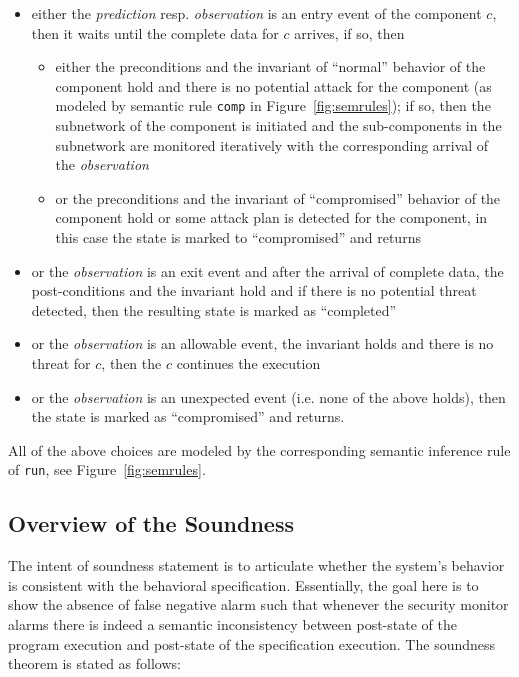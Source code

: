 \documentclass[conference]{IEEEtran}
\begin{document}
\begin{itemize}
\item either the \emph{prediction} resp. \emph{observation} is an entry event of the component $c$, then it waits until the complete data for $c$ arrives, if so, then
\begin{itemize}
\item either the preconditions and the invariant of ``normal'' behavior of the component hold and there is no potential attack for the component (as modeled by semantic rule {\tt comp} in Figure~\ref{fig:semrules}); if so, then the subnetwork of the component is initiated and the sub-components in the subnetwork are monitored iteratively with the corresponding arrival of the \emph{observation}
\item or the preconditions and the invariant of ``compromised''  behavior of the component hold or some attack plan is detected for the component, in this case the state is marked to ``compromised'' and returns
\end{itemize}
\item or the \emph{observation} is an exit event and after the arrival of complete data, the post-conditions and the invariant hold and if there is no potential threat detected, then the resulting state is marked as ``completed''
\item or the \emph{observation} is an allowable event, the invariant holds and there is no threat for $c$, then the $c$ continues the execution
\item or the \emph{observation} is an unexpected event (i.e. none of the above holds), then the state is marked as ``compromised'' and returns.
\end{itemize}
All of the above choices are modeled by the corresponding semantic inference rule of \texttt{run}, see Figure~\ref{fig:semrules}.
\subsection{Overview of the Soundness}\label{subsec:soundness}
The intent of soundness statement is to articulate whether the system's behavior is consistent with the behavioral specification. Essentially, the goal here is to show the absence of false negative alarm such that whenever the security monitor alarms there is indeed a semantic inconsistency between post-state of the program execution and post-state of the specification execution. The soundness theorem is stated as follows:
\end{document}
